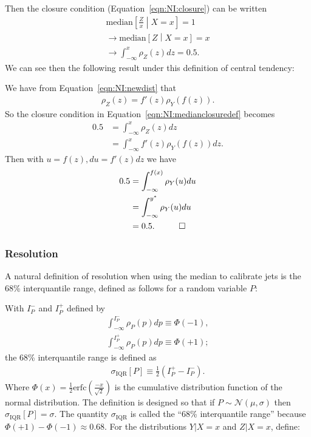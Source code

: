 Then the closure condition (Equation~\ref{eqn:NI:closure}) can be written
\begin{align}
\text{median}\left[\frac{Z}{x}\middle| X=x\right] = 1\nonumber\\
\rightarrow \text{median}\left[Z\middle| X=x\right] = x\nonumber\\
\rightarrow \int_{-\infty}^{x} \rho_Z(z) dz = 0.5.
\label{eqn:NI:medianclosuredef}
\end{align}
We can see then the following result under this definition of central tendency:

\vspace{5mm}


\vspace{5mm}

 We have from Equation~\ref{eqn:NI:newdist} that
\begin{align}
\rho_Z(z) = f'(z)\rho_Y(f(z)).
\end{align}
So the closure condition in Equation~\ref{eqn:NI:medianclosuredef} becomes
\begin{align}
0.5 &= \int_{-\infty}^{x} \rho_Z(z) dz\nonumber\\
&=\int_{-\infty}^{x} f'(z)\rho_Y(f(z)) dz.
\end{align}
Then with $u = f(z), du = f'(z) dz$ we have
\begin{align}
0.5 &= \int_{-\infty}^{f(x)} \rho_Y(u) du\nonumber\\
&=\int_{-\infty}^{y^*} \rho_Y(u) du\nonumber\\
&=0.5. \hspace{1 cm} \Box
\end{align}

\subsubsection{Resolution}
A natural definition of resolution when using the median to calibrate jets is the 68\% interquantile range, defined as follows for a random variable $P$:

\noindent With $I_P^-$ and $I_P^+$ defined by
\begin{align}
\int_{-\infty}^{I_P^-}\rho_P(p)dp \equiv \Phi(-1),\\
\int_{-\infty}^{I_P^+}\rho_P(p)dp \equiv \Phi(+1);
\end{align}
the 68\% interquantile range is defined as
\begin{align}
\sigma_\text{IQR}[P] \equiv \frac{1}{2}\left(I_P^+-I_P^-\right).
\end{align}
Where $\Phi(x)=\frac{1}{2}\text{erfc}\left(\frac{-x}{\sqrt{2}}\right)$ is the cumulative distribution function of the normal distribution. The definition is designed so that if $P\sim\mathcal{N}(\mu,\sigma)$ then $\sigma_\text{IQR}[P]=\sigma$. The quantity $\sigma_\text{IQR}$ is called the ``68\% interquantile range'' because $\Phi(+1)-\Phi(-1) \approx 0.68$.  For the distributions $Y|X=x$ and $Z|X=x$, define:

